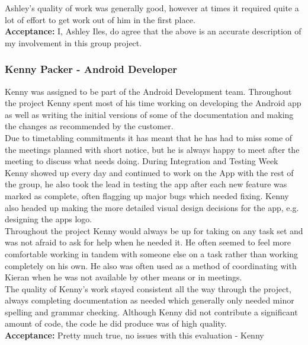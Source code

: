 \documentclass{article}
\begin{document}
		Ashley's quality of work was generally good, however at times it required quite a lot of effort to get work out of him in the first place. \\
		
{\bf Acceptance:} I, Ashley Iles, do agree that the above is an accurate description of my involvement in this group project.


		\subsubsection{Kenny Packer - Android Developer}

		Kenny was assigned to be part of the Android Development team. Throughout the project Kenny spent most of his time working on developing the Android app as well as writing the initial versions of some of the documentation and making the changes as recommended by the customer. \\
		
		Due to timetabling commitments it has meant that he has had to miss some of the meetings planned with short notice, but he is always happy to meet after the meeting to discuss what needs doing. During Integration and Testing Week Kenny showed up every day and continued to work on the App with the rest of the group, he also took the lead in testing the app after each new feature was marked as complete, often flagging up major bugs which needed fixing. Kenny also headed up making the more detailed visual design decisions for the app, e.g. designing the apps logo. \\
		
		Throughout the project Kenny would always be up for taking on any task set and was not afraid to ask for help when he needed it. He often seemed to feel more comfortable working in tandem with someone else on a task rather than working completely on his own. He also was often used as a method of coordinating with Kieran when he was not available by other means or in meetings. \\
		
		The quality of Kenny's work stayed consistent all the way through the project, always completing documentation as needed which generally only needed minor spelling and grammar checking. Although Kenny did not contribute a significant amount of code, the code he did produce was of high quality. \\
		
{\bf Acceptance:} Pretty much true, no issues with this evaluation - Kenny
\end{document}
